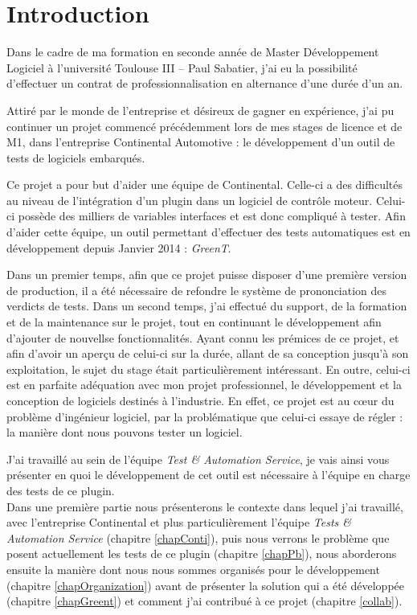 \chapter*{Introduction}
Dans le cadre de ma formation en seconde année de Master Développement Logiciel à l'université Toulouse III – Paul Sabatier, j'ai eu la possibilité d'effectuer un contrat de professionnalisation en alternance d'une durée d'un an.

Attiré par le monde de l'entreprise et désireux de gagner en expérience, j'ai pu continuer un projet commencé précédemment lors de mes stages de licence et de M1, dans l'entreprise Continental Automotive : le développement d'un outil de tests de logiciels embarqués.

Ce projet a pour but d'aider une équipe de Continental. Celle-ci a des difficultés au niveau de l'intégration d'un plugin dans un logiciel de contrôle moteur. Celui-ci possède des milliers de variables interfaces et est donc compliqué à tester. Afin d'aider cette équipe, un outil permettant d'effectuer des tests automatiques est en développement depuis Janvier 2014 : \textit{GreenT}.

Dans un premier temps, afin que ce projet puisse disposer d'une première version de production, il a été nécessaire de refondre le système de prononciation des verdicts de tests.\newline
Dans un second temps, j'ai effectué du support, de la formation et de la maintenance sur le projet, tout en continuant le développement afin d'ajouter de nouvellse fonctionnalités.\newline
Ayant connu les prémices de ce projet, et afin d'avoir un aperçu de celui-ci sur la durée, allant de sa conception jusqu'à son exploitation, le sujet du stage était particulièrement intéressant. En outre, celui-ci est en parfaite adéquation avec mon projet professionnel, le développement et la conception de logiciels destinés à l'industrie. En effet, ce projet est au cœur du problème d'ingénieur logiciel, par la problématique que celui-ci essaye de régler :  la manière dont nous pouvons tester un logiciel. 


J'ai travaillé au sein de l'équipe \textit{Test \& Automation Service}, je vais ainsi vous présenter en quoi le développement de cet outil est nécessaire à l'équipe en charge des tests de ce plugin.\\ Dans une première partie nous présenterons le contexte dans lequel j'ai travaillé, avec l'entreprise Continental et plus particulièrement l'équipe \textit{Tests \& Automation Service} (chapitre \ref{chapConti}), puis nous verrons le problème que posent actuellement les tests de ce plugin (chapitre \ref{chapPb}), nous aborderons ensuite la manière dont nous nous sommes organisés pour le développement (chapitre \ref{chapOrganization}) avant de présenter la solution qui a été développée (chapitre \ref{chapGreent}) et comment j'ai contribué à ce projet (chapitre \ref{collab}). 
